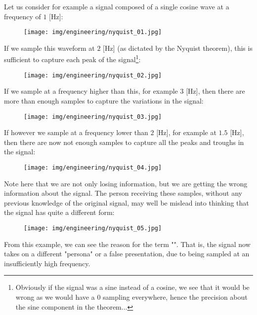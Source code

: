 	Let us consider for example a signal composed of a single cosine wave at a frequency of $1$ [Hz]:
	\begin{figure}[H]
		\centering
		\texttt{[image: img/engineering/nyquist\_01.jpg]}
	\end{figure}
	If we sample this waveform at $2$ [Hz] (as dictated by the Nyquist theorem), this is sufficient to capture each peak of the signal\footnote{Obviously if the signal was a sine instead of a cosine, we see that it would be wrong as we would have a $0$ sampling everywhere, hence the precision about the sine component in the theorem...}:
	\begin{figure}[H]
		\centering
		\texttt{[image: img/engineering/nyquist\_02.jpg]}
	\end{figure}
	If we sample at a frequency higher than this, for example $3$ [Hz], then there are more than enough samples to capture the variations in the signal:
	\begin{figure}[H]
		\centering
		\texttt{[image: img/engineering/nyquist\_03.jpg]}
	\end{figure}
	If however we sample at a frequency lower than $2$ [Hz], for example at $1.5$ [Hz], then there are now not enough samples to capture all the peaks and troughs in the signal:
	\begin{figure}[H]
		\centering
		\texttt{[image: img/engineering/nyquist\_04.jpg]}
	\end{figure}
	Note here that we are not only losing information, but we are getting the wrong information about the signal. The person receiving these samples, without any previous knowledge of the original signal, may well be mislead into thinking that the signal has quite a different form:
	\begin{figure}[H]
		\centering
		\texttt{[image: img/engineering/nyquist\_05.jpg]}
	\end{figure}
	From this example, we can see the reason for the term "". That is, the signal now takes on a different "persona" or a false presentation, due to being sampled at an insufficiently high frequency.

